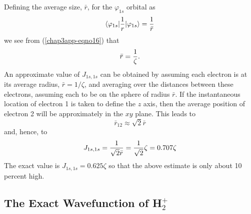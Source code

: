 Defining the average size, ${\bar r}$, for the $\varphi_{1s}$ orbital as
\begin{equation}
\langle \varphi_{1s} \vert {1 \over r} \vert \varphi_{1s} \rangle = {1 \over 
{\bar r}}
\end{equation}
we see from (\ref{chap3app-eqno16}) that
\begin{equation}
{\bar r} = {1 \over \zeta} .
\end{equation}
An approximate value of $J_{1s ,1s}$ can be obtained by assuming each 
electron is at its average radius, ${\bar r} = 1 / \zeta$, and averaging 
over the distances between these electrons, assuming each to be on the 
sphere of radius ${\bar r}$.  If the instantaneous location of electron 1 
is taken to define the $z$ axis, then the average position of electron 2 
will be approximately in the $xy$ plane.  This leads to
\begin{equation}
{\bar r}_{12} \approx \sqrt{2} {\bar r}
\end{equation}
and, hence, to
\begin{equation}
J_{1s , 1s} = {1 \over \sqrt{2} {\bar r}} = {1 \over \sqrt{2}} 
\zeta = 0.707 \zeta
\end{equation}
The exact value is $J_{1s , 1s} = 0.625 \zeta$ so that the above estimate is 
only about 10 percent high.

\subsection{The Exact Wavefunction of H$^+_2$}
\label{chap3-app-d}


